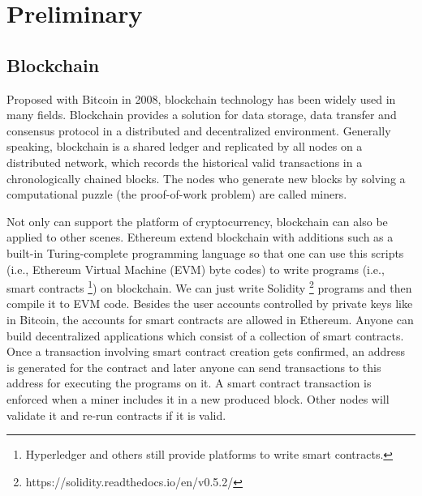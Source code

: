 \documentclass[conference]{IEEEtran}
\begin{document}
\section{Preliminary}
\label{preli}

	\subsection{Blockchain}
	Proposed with Bitcoin \cite{nakamoto2008bitcoin} in 2008, blockchain technology has been widely used in many fields. Blockchain provides a solution for data storage, data transfer and consensus protocol in a distributed and decentralized environment. Generally speaking, blockchain is a shared ledger and replicated by all nodes on a distributed network, which records the historical valid transactions in a chronologically chained blocks. The nodes who generate new blocks by solving a computational puzzle (the proof-of-work problem) are called miners.
	
	Not only can support the platform of cryptocurrency, blockchain can also be applied to other scenes. Ethereum \cite{wood2014ethereum} extend blockchain with additions such as a built-in Turing-complete programming language so that one can use this scripts (i.e., Ethereum Virtual Machine (EVM) byte codes) to write programs (i.e., smart contracts \footnote{Hyperledger and others still provide platforms to write smart contracts.}) on blockchain. We can just write Solidity \footnote{https://solidity.readthedocs.io/en/v0.5.2/} programs and then compile it to EVM code. Besides the user accounts controlled by private keys like in Bitcoin, the accounts for smart contracts are allowed in Ethereum. Anyone can build decentralized applications which consist of a collection of smart contracts. Once a transaction involving smart contract creation gets confirmed, an address is generated for the contract and later anyone can send transactions to this address for executing the programs on it. A smart contract transaction is enforced when a miner includes it in a new produced block. Other nodes will validate it and re-run contracts if it is valid.
	
\end{document}
